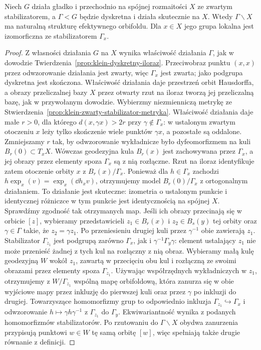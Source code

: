 \begin{stwierdzenie}
\label{prop:klein-iloraz-orbifoldowy}
Niech $G$ działa gładko i przechodnio na spójnej rozmaitości $X$
ze zwartym stabilizatorem, a $\Gamma<G$ będzie dyskretna i działa
skutecznie na $X$. Wtedy $\Gamma\backslash X$ ma naturalną
strukturę efektywnego orbifoldu. Dla $x\in X$ jego grupa lokalna
jest izomorficzna ze stabilizatorem $\Gamma_x$.
\end{stwierdzenie}
\begin{proof}
Z własności działania $G$ na $X$ wynika właściwość działania
$\Gamma$, jak w dowodzie
Twierdzenia~\ref{prop:klein-dyskretny-iloraz}. Przeciwobraz
punktu $(x,x)$ przez odwzorowanie działania jest zwarty, więc
$\Gamma_x$ jest zwarta; jako podgrupa dyskretna jest skończona.
Właściwość działania daje przestrzeń orbit Hausdorffa,
a obrazy przeliczalnej bazy $X$ przez otwarty rzut na iloraz
tworzą jej przeliczalną bazę, jak w przywołanym dowodzie.
Wybierzmy niezmienniczą metrykę ze
Stwierdzenia~\ref{prop:klein-zwarty-stabilizator-metryka}.
Właściwość działania daje małe $r>0$, dla którego
$d(x,\gamma x)>2r$ przy $\gamma\notin\Gamma_x$: w ustalonym
zwartym otoczeniu $x$ leży tylko skończenie wiele punktów
$\gamma x$, a pozostałe są oddalone. Zmniejszamy $r$ tak, by
odwzorowanie wykładnicze było dyfeomorfizmem na kuli
$B_r(0)\subset T_xX$. Wówczas geodezyjna kula $B_r(x)$ jest
zachowywana przez $\Gamma_x$, a jej obrazy przez elementy spoza
$\Gamma_x$ są z nią rozłączne. Rzut na iloraz identyfikuje zatem
otoczenie orbity $x$ z $B_r(x)/\Gamma_x$.
Ponieważ dla $h\in\Gamma_x$ zachodzi
$h\exp_x(v)=\exp_x(\dd h_xv)$, otrzymujemy model
$B_r(0)/\Gamma_x$ z ortogonalnym działaniem. To działanie jest
skuteczne: izometria o ustalonym punkcie i identycznej różniczce
w tym punkcie jest identycznością na spójnej $X$.
Sprawdźmy zgodność tak otrzymanych map. Jeśli ich obrazy
przecinają się w orbicie $[z]$, wybieramy przedstawicieli
$z_1\in B_r(x)$ i $z_2\in B_s(y)$ tej orbity oraz
$\gamma\in\Gamma$ takie, że $z_2=\gamma z_1$.
Po przeniesieniu drugiej kuli przez $\gamma^{-1}$ obie
zawierają $z_1$. Stabilizator $\Gamma_{z_1}$ jest podgrupą
zarówno $\Gamma_x$, jak i $\gamma^{-1}\Gamma_y\gamma$:
element ustalający $z_1$ nie może przenieść żadnej z tych
kul na rozłączny z nią obraz. Wybieramy małą kulę
geodezyjną $W$ wokół $z_1$, zawartą w przecięciu obu kul
i rozłączną ze swoimi obrazami przez elementy spoza
$\Gamma_{z_1}$. Używając współrzędnych wykładniczych w
$z_1$, otrzymujemy z $W/\Gamma_{z_1}$ wspólną mapę
orbifoldową, która zanurza
się w obie wyjściowe mapy przez inkluzję do pierwszej kuli
oraz przez $\gamma$ po inkluzji do drugiej. Towarzyszące
homomorfizmy grup to odpowiednio inkluzja
$\Gamma_{z_1}\hookrightarrow\Gamma_x$ i odwzorowanie
$h\mapsto\gamma h\gamma^{-1}$ z $\Gamma_{z_1}$ do
$\Gamma_y$.
Ekwiwariantność wynika z podanych homomorfizmów
stabilizatorów. Po rzutowaniu do $\Gamma\backslash X$
obydwa zanurzenia przypisują punktowi $w\in W$ tę samą
orbitę $[w]$, więc spełniają także drugie równanie
z definicji.
\end{proof}

